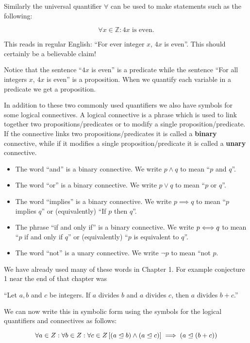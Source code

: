 Similarly the universal quantifier $\forall$ can be used to make statements such as the following:

\[
\forall x \in \mathbb{Z}:  4x \textrm{ is even}.
\]

This reads in regular English: ``For ever integer $x$, $4x$ is even''.  This should certainly be a believable claim! 

Notice that the sentence ``$4x$ is even'' is a predicate while the sentence ``For all integers $x$, $4x$ is even'' is a proposition.  When we quantify each variable in a predicate we get a proposition.

In addition to these two commonly used quantifiers we also have symbols for some logical connectives.  A logical connective is a phrase which is used to link together two propositions/predicates or to modify a single proposition/predicate.  If the connective links two propositions/predicates it is called a  \textbf{binary} connective, while if it modifies a single proposition/predicate it is called a  \textbf{unary} connective.


\begin{itemize}
		\item The word ``and'' is a binary connective.  We write  $p \wedge q$ to mean ``$p$ and $q$''.   
		\item The word ``or'' is a binary connective.  We write  $p \vee q$ to mean ``$p$ or $q$''.   
		\item The word ``implies'' is a binary connective.  We write  $p \implies q$ to mean ``$p$ implies $q$'' or (equivalently) ``If $p$ then $q$''.
		\item The phrase ``if and only if'' is a binary connective.  We write  $p \Longleftrightarrow q$ to mean ``$p$ if and only if $q$'' or (equivalently) ``$p$ is equivalent to $q$''.
		\item The word ``not'' is a unary connective.  We write  $\neg p$ to mean ``not $p$.
	\end{itemize}

We have already used many of these words in Chapter 1.  For example conjecture 1 near the end of that chapter was

``Let $a,b$ and $c$ be integers.  If $a$ divides $b$ and $a$ divides $c$, then $a$ divides $b+c$.''

We can now write this in symbolic form using the symbols for the logical quantifiers and connectives as follows:

\[
\forall a \in Z : \forall b \in Z : \forall c \in Z \left[ (a \trianglelefteq b) \wedge (a \trianglelefteq c) \right] \implies (a \trianglelefteq (b+c))
\] 

